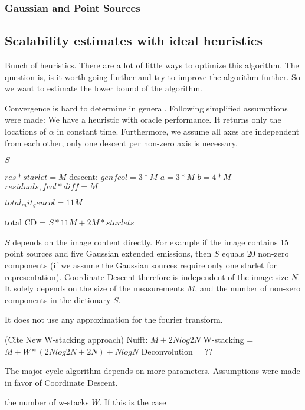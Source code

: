 \subsubsection{Gaussian and Point Sources}

\subsection{Scalability estimates with ideal heuristics}
Bunch of heuristics. There are a lot of little ways to optimize this algorithm. The question is, is it worth going further and try to improve the algorithm further. So we want to estimate the lower bound of the algorithm.

Convergence is hard to determine in general. Following simplified assumptions were made: We have a heuristic with oracle performance. It returns only the locations of $\alpha$ in constant time. Furthermore, we assume all axes are independent from each other, only one descent per non-zero axis is necessary.

$S$


$res * starlet = M$
descent:
$gen fcol = 3*M$
$a = 3 * M$
$b = 4 * M$
$residuals, fcol*diff =  M$

$total_mit_gencol = 11M$

total CD = $S * 11M + 2M * starlets$

$S$ depends on the image content directly. For example if the image contains 15 point sources and five Gaussian extended emissions, then $S$ equals 20 non-zero components (if we assume the Gaussian sources require only one starlet for representation). Coordinate Descent therefore is independent of the image size $N$. It solely depends on the size of the measurements $M$, and the number of non-zero components in the dictionary $S$. 

It does not use any approximation for the fourier transform.



(Cite New W-stacking approach)
Nufft: $M + 2N log 2N$
W-stacking = $M + W*(2N log 2N + 2N) + N log N$
Deconvolution = ??

The major cycle algorithm depends on more parameters. Assumptions were made in favor of Coordinate Descent.

the number of w-stacks $W$. If this is the case

